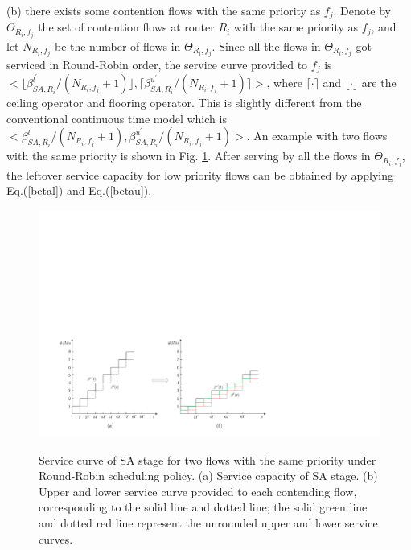 \documentclass[10pt,journal]{IEEEtran}
\begin{document}
(b) there exists some contention flows with the same priority as $f_j$. Denote by $\Theta_{R_i,f_j}$ the set of contention flows at router $R_i$ with the same priority as $f_j$, and let $N_{R_i,f_j}$ be the number of flows in $\Theta_{R_i,f_j}$. Since all the flows in $\Theta_{R_i,f_j}$ got serviced in Round-Robin order, the service curve provided to $f_j$ is $<\lfloor\beta^{l^\prime}_{SA,R_i}/(N_{R_i,f_j}+1)\rfloor,\lceil\beta^{u^\prime}_{SA,R_i}/(N_{R_i,f_j}+1)\rceil>$, where $\lceil\cdot\rceil$ and $\lfloor\cdot\rfloor$ are the ceiling operator and flooring operator. This is slightly different from the conventional continuous time model which is $<\beta^{l^\prime}_{SA,R_i}/(N_{R_i,f_j}+1),\beta^{u^\prime}_{SA,R_i}/(N_{R_i,f_j}+1)>$. An example with two flows with the same priority is shown in Fig. \ref{roundrobin}. After serving by all the flows in $\Theta_{R_i,f_j}$, the leftover service capacity for low priority flows can be obtained by applying Eq.(\ref{betal}) and Eq.(\ref{betau}).
\begin{figure}
  \centering
  \includegraphics[scale=0.5]{figures/RoundRobin.pdf}\\
  \caption{Service curve of SA stage for two flows with the same priority under Round-Robin scheduling policy. (a) Service capacity of SA stage. (b) Upper and lower service curve provided to each contending flow, corresponding to the solid line and dotted line; the solid green line and dotted red line represent the unrounded upper and lower service curves.}\label{roundrobin}
\end{figure}
\end{document}
